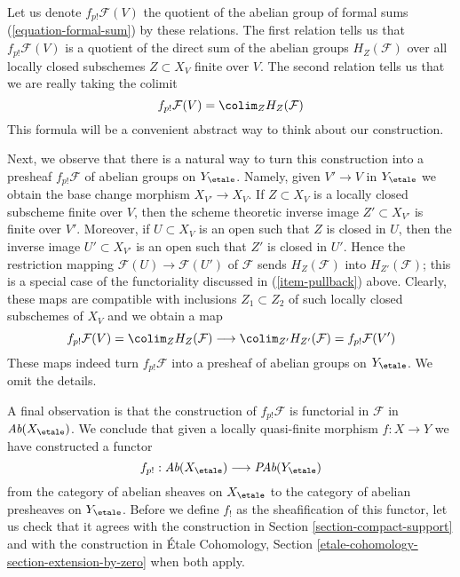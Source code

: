 \medskip\noindent
Let us denote $f_{p!}\mathcal{F}(V)$ the quotient of the abelian
group of formal sums (\ref{equation-formal-sum}) by these relations.
The first relation tells us that $f_{p!}\mathcal{F}(V)$ is a quotient
of the direct sum of the abelian groups $H_Z(\mathcal{F})$
over all locally closed subschemes $Z \subset X_V$ finite over $V$.
The second relation tells us that we are really taking the colimit
\begin{equation}
\label{equation-colimit-definition}
f_{p!}\mathcal{F}(V) = \colim_Z H_Z(\mathcal{F})
\end{equation}
This formula will be a convenient abstract way to think about
our construction.

\medskip\noindent
Next, we observe that there is a natural way to turn this construction
into a presheaf $f_{p!}\mathcal{F}$ of abelian groups on $Y_\etale$.
Namely, given $V' \to V$ in $Y_\etale$ we obtain the base change morphism
$X_{V'} \to X_V$. If $Z \subset X_V$ is a locally closed subscheme
finite over $V$, then the scheme theoretic inverse image $Z' \subset X_{V'}$
is finite over $V'$. Moreover, if $U \subset X_V$ is an open such
that $Z$ is closed in $U$, then the inverse image $U' \subset X_{V'}$
is an open such that $Z'$ is closed in $U'$. Hence the restriction
mapping $\mathcal{F}(U) \to \mathcal{F}(U')$ of $\mathcal{F}$
sends $H_Z(\mathcal{F})$ into $H_{Z'}(\mathcal{F})$; this is a special
case of the functoriality discussed in (\ref{item-pullback}) above.
Clearly, these maps are compatible with inclusions
$Z_1 \subset Z_2$ of such locally closed subschemes of $X_V$ and
we obtain a map
$$
f_{p!}\mathcal{F}(V) = \colim_Z H_Z(\mathcal{F})
\longrightarrow
\colim_{Z'} H_{Z'}(\mathcal{F}) =
f_{p!}\mathcal{F}(V')
$$
These maps indeed turn $f_{p!}\mathcal{F}$ into a presheaf of abelian
groups on $Y_\etale$. We omit the details.

\medskip\noindent
A final observation is that the construction of $f_{p!}\mathcal{F}$
is functorial in $\mathcal{F}$ in $\textit{Ab}(X_\etale)$.
We conclude that given a locally quasi-finite morphism $f : X \to Y$
we have constructed a functor
$$
f_{p!} :
\textit{Ab}(X_\etale)
\longrightarrow
\textit{PAb}(Y_\etale)
$$
from the category of abelian sheaves on $X_\etale$ to the category
of abelian presheaves on $Y_\etale$. Before we define $f_!$ as the
sheafification of this functor, let us check that it agrees with
the construction in Section \ref{section-compact-support}
and with the construction in
\'Etale Cohomology, Section \ref{etale-cohomology-section-extension-by-zero}
when both apply.

